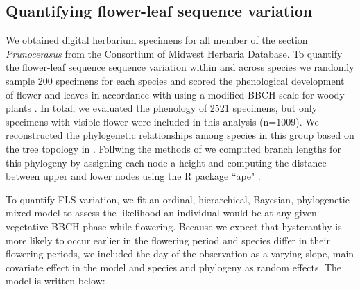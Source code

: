 \documentclass{article}[11pt]
\begin{document}

\subsection{Quantifying flower-leaf sequence variation}
We obtained digital herbarium specimens for all member of the section \textit{Prunocerasus} from the Consortium of Midwest Herbaria Database. To quantify the flower-leaf sequence sequence variation within and across species we randomly sample 200 specimens for each species and scored the phenological development of flower and leaves in accordance with using a modified BBCH scale for woody plants \citep{Finn2007}. In total, we evaluated the phenology of 2521 specimens, but only specimens with visible flower were included in this analysis (n=1009). We reconstructed the phylogenetic relationships among species in this group based on the tree topology in \citet{Shaw:2004aa}. Follwing the methods of \citet{Granfen1989} we computed branch lengths for this phylogeny by assigning each node a height and computing the distance between upper and lower nodes using the R package ``ape" \citep{}.

To quantify FLS variation, we fit an ordinal, hierarchical, Bayesian, phylogenetic mixed model \citep{Garamszegi2014} to assess the likelihood an individual would be at any given vegetative BBCH phase while flowering. Because we expect that hysteranthy is more likely to occur earlier in the flowering period and species differ in their flowering periods, we included the day of the observation as a varying slope, main covariate effect in the model and species and phylogeny as random effects. The model is written below:\\
\end{document}
